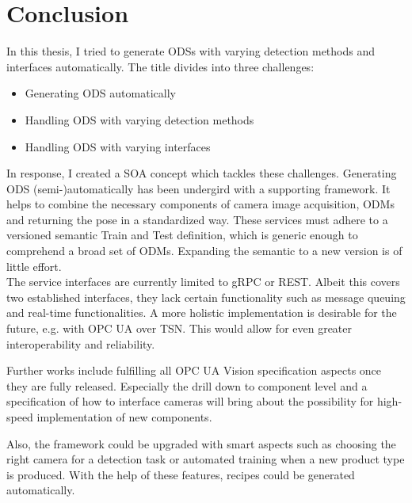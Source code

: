 \chapter{Conclusion\label{cha:chapter7}}

In this thesis, I tried to generate ODSs with varying detection methods and interfaces automatically. The title divides into three challenges:
\begin{itemize}
    \item Generating ODS automatically
    \item Handling ODS with varying detection methods
    \item Handling ODS with varying interfaces
\end{itemize}
In response, I created a SOA concept which tackles these challenges. Generating ODS (semi-)automatically has been undergird with a supporting framework. It helps to combine the necessary components of camera image acquisition, ODMs and returning the pose in a standardized way. These services must adhere to a versioned semantic Train and Test definition, which is generic enough to comprehend a broad set of ODMs. Expanding the semantic to a new version is of little effort.\\
The service interfaces are currently limited to gRPC or REST. Albeit this covers two established interfaces, they lack certain functionality such as message queuing and real-time functionalities. A more holistic implementation is desirable for the future, e.g. with OPC UA over TSN. This would allow for even greater interoperability and reliability.

Further works include fulfilling all OPC UA Vision specification aspects once they are fully released. Especially the drill down to component level and a specification of how to interface cameras will bring about the possibility for high-speed implementation of new components.

Also, the framework could be upgraded with smart aspects such as choosing the right camera for a detection task or automated training when a new product type is produced. With the help of these features, recipes could be generated automatically.
